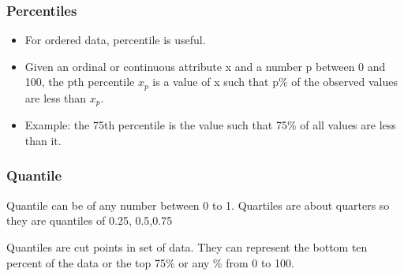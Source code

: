 






\begin{frame}[fragile]\frametitle{Percentiles}	
\begin{itemize}
\item For ordered data, percentile is useful.
\item Given an ordinal or continuous attribute x and a number p between 0 and 100, the pth percentile $x_p$ is a value of x such that p\% of the observed values are less than $x_p$.
\item Example: the 75th percentile is the value such that 75\% of all values are less than it.
\end{itemize}

\end{frame}


\begin{frame}[fragile]\frametitle{Quantile}	
Quantile can be of any number between 0 to 1. Quartiles are about quarters so they are quantiles of 0.25, 0.5,0.75

Quantiles are cut points in set of data. They can represent the bottom
ten percent of the data or the top 75\% or any \% from 0 to 100.
\end{frame}



